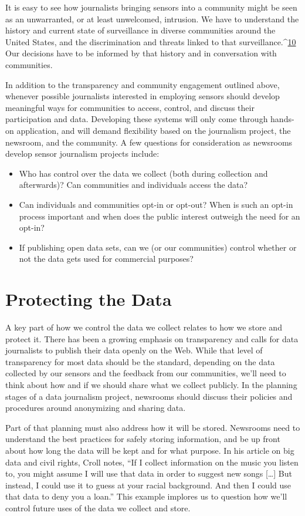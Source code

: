 \begin{itemize}
It is easy to see how journalists bringing sensors into a community might
be seen as an unwarranted, or at least unwelcomed, intrusion. We have to
understand the history and current state of surveillance in diverse communities
around the United States, and the discrimination and threats linked
to that surveillance.^{\href{#endnotes-stearns}{10}} Our decisions have to be informed by that history and
in conversation with communities.

In addition to the transparency and community engagement outlined
above, whenever possible journalists interested in employing sensors
should develop meaningful ways for communities to access, control, and
discuss their participation and data. Developing these systems will only
come through hands-on application, and will demand flexibility based
on the journalism project, the newsroom, and the community. A few
questions for consideration as newsrooms develop sensor journalism
projects include:
\begin{itemize}
\item Who has control over the data we collect (both during
collection and afterwards)? Can communities and individuals
access the data?
\item Can individuals and communities opt-in or opt-out? When is
such an opt-in process important and when does the public
interest outweigh the need for an opt-in?
\item If publishing open data sets, can we (or our communities) control
whether or not the data gets used for commercial purposes?
\end{itemize}

\section{Protecting the Data}
A key part of how we control the data we collect relates to how we store and
protect it. There has been a growing emphasis on transparency and calls for
data journalists to publish their data openly on the Web. While that level
of transparency for most data should be the standard, depending on the
data collected by our sensors and the feedback from our communities, we'll
need to think about how and if we should share what we collect publicly. In
the planning stages of a data journalism project, newsrooms should discuss
their policies and procedures around anonymizing and sharing data.

Part of that planning must also address how it will be stored. Newsrooms
need to understand the best practices for safely storing information, and
be up front about how long the data will be kept and for what purpose.
In his article on big data and civil rights, Croll notes, ``If I collect information on the music you listen to, you might assume I will use that data in
order to suggest new songs [\ldots] But instead, I could use it to guess at your
racial background. And then I could use that data to deny you a loan.'' This
example implores us to question how we'll control future uses of the data
we collect and store.


\end{itemize}
